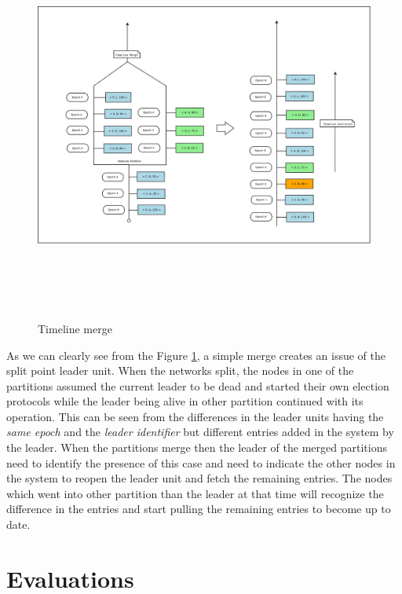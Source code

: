 \documentclass[12pt,a4paper,twoside,openright]{book}
\begin{document}
\begin{figure}[H]
	\includegraphics[width=14cm, height= 13cm]{timeline-merge}
	
	\caption{Timeline merge}
	\label{fig:timelineMerge}
\end{figure}


\newpage As we can clearly see from the Figure \ref{fig:timelineMerge}, a simple merge creates an issue of the split point leader unit. When the networks split, the nodes in one of the partitions assumed the current leader to be dead and started their own election protocols while the leader being alive in other partition continued with its operation. This can be seen from the differences in the leader units having the \textit{same epoch} and the \textit{leader identifier}  but different entries added in the system by the leader. When the partitions merge then the leader of the merged partitions need to identify the presence of this case and need to indicate the other nodes in the system to reopen the leader unit and fetch the remaining entries. The nodes which went into other partition than the leader at that time will recognize the difference in the entries and start pulling the remaining entries to become up to date.


\chapter{Evaluations}
\label{chap:eval}
\end{document}
